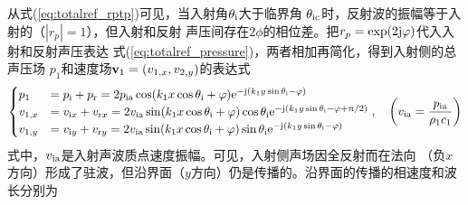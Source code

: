 \documentclass[UTF8]{ctexbook}
\begin{document}
从式(\ref{eq:totalref_rptp})可见，当入射角$\theta_\text{i}$大于临界角
$\theta_\text{ic}$时，反射波的振幅等于入射的（$|r_p|=1$），但入射和反射
声压间存在$2\phi$的相位差。把$r_p=\exp(2\mathrm{j} \varphi)$代入入射和反射声压表达
式(\ref{eq:totalref_pressure})，两者相加再简化，得到入射侧的总声压场
$p_1$和速度场$\vb{v}_1=(v_{1,x}, v_{2,y})$的表达式
\begin{equation}
	\begin{cases}
		p_1&= p\st{i}+p\st{r} = 2p\st{ia}\cos(k_1x\cos\theta\st{i}+\phi)
		\me^{-\mj (k_1y\sin\theta\st{i}-\phi)}\\
		v_{1,x}&= v_{\mi x} + v_{\mathrm{r}x} = 2v\st{ia}\sin
		(k_1x\cos\theta\st{i}+\phi)\cos\theta\st{i}
		\me^{-\mj \qty(k_1y\sin\theta\st{i}-\phi+ \uppi/2)}\\
		v_{1,y}&= v_{\mi y} + v_{\mathrm{r}y} = 2v\st{ia}\sin
		(k_1x\cos\theta\st{i}+\phi)\sin\theta\st{i}
		\me^{-\mj \qty(k_1y\sin\theta\st{i}-\phi)}
	\end{cases}
	\qc \qty(v\st{ia} = \frac{p\st{ia}}{\rho_1c_1})
\end{equation}
式中，$v_\text{ia}$是入射声波质点速度振幅。可见，入射侧声场因全反射而在法向
（负$x$方向）形成了驻波，但沿界面（$y$方向）仍是传播的。沿界面的传播的相速度和波长分别为
\end{document}
